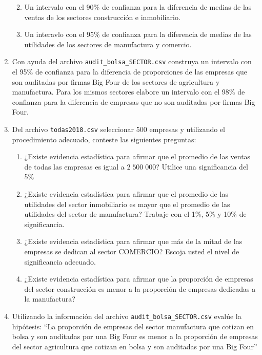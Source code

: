\documentclass[letterpaper,]{book}
\providecommand{\tightlist}{%
  \setlength{\itemsep}{0pt}\setlength{\parskip}{0pt}}
\begin{document}
\begin{enumerate}
  \begin{enumerate}
  \def\labelenumii{\alph{enumii}.}
  \tightlist
  \item
    Un intervalo con el 90\% de confianza para la diferencia de medias de las ventas de los sectores construcción e inmobiliario.
  \item
    Un interavlo con el 95\% de confianza para la diferencia de medias de las utilidades de los sectores de manufactura y comercio.
  \end{enumerate}
\item
  Con ayuda del archivo \texttt{audit\_bolsa\_SECTOR.csv} construya un intervalo con el 95\% de confianza para la diferencia de proporciones de las empresas que son auditadas por firmas Big Four de los sectores de agricultura y manufactura. Para los mismos sectores elabore un intervalo con el 98\% de confianza para la diferencia de empresas que no son auditadas por firmas Big Four.
\item
  Del archivo \texttt{todas2018.csv} seleccionar 500 empresas y utilizando el procedimiento adecuado, conteste las siguientes preguntas:

  \begin{enumerate}
  \def\labelenumii{\alph{enumii}.}
  \tightlist
  \item
    ¿Existe evidencia estadística para afirmar que el promedio de las ventas de todas las empresas es igual a \(2\;500\;000\)? Utilice una significancia del 5\%
  \item
    ¿Existe evidencia estadística para afirmar que el promedio de las utilidades del sector inmobiliario es mayor que el promedio de las utilidades del sector de manufactura? Trabaje con el 1\%, 5\% y 10\% de significancia.
  \item
    ¿Existe evidencia estadística para afirmar que más de la mitad de las empresas se dedican al sector COMERCIO? Escoja usted el nivel de significancia adecuado.
  \item
    ¿Existe evidencia estadística para afirmar que la proporción de empresas del sector construcción es menor a la proporción de empresas dedicadas a la manufactura?
  \end{enumerate}
\item
  Utilizando la información del archivo \texttt{audit\_bolsa\_SECTOR.csv} evalúe la hipótesis: ``La proporción de empresas del sector manufactura que cotizan en bolsa y son auditadas por una Big Four es menor a la proporción de empresas del sector agricultura que cotizan en bolsa y son auditadas por una Big Four''
\end{enumerate}
\end{document}
